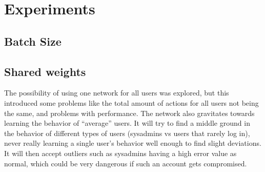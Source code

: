 \chapter{Experiments}\label{ch:experiments}

\section{Batch Size}


\section{Shared weights}
The possibility of using one network for all users was explored, but this introduced some problems like the total amount of actions for all users not being the same, and problems with performance. The network also gravitates towards learning the behavior of \enquote{average} users. It will try to find a middle ground in the behavior of different types of users (sysadmins vs users that rarely log in), never really learning a single user's behavior well enough to find slight deviations. It will then accept outliers such as sysadmins having a high error value as normal, which could be very dangerous if such an account gets compromised.